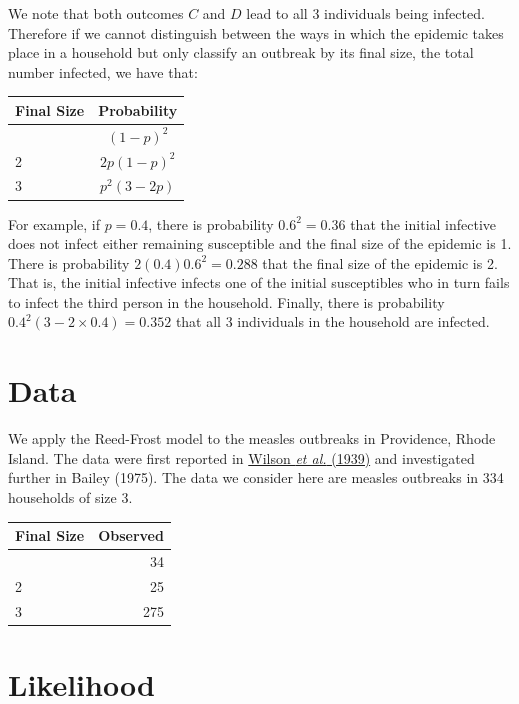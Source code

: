 \documentclass[
]{book}
\begin{document}
We note that both outcomes \(C\) and \(D\) lead to all 3 individuals being infected. Therefore if we cannot distinguish between the ways in which the epidemic takes place in a household but only classify an outbreak by its final size, the total number infected, we have that:

\begin{longtable}[]{@{}lc@{}}
\toprule\noalign{}
Final Size & Probability \\
\midrule\noalign{}
\endhead
\bottomrule\noalign{}
\endlastfoot
1 & \((1-p)^2\) \\
2 & \(2p(1-p)^2\) \\
3 & \(p^2(3-2p)\) \\
\end{longtable}

For example, if \(p=0.4\), there is probability \(0.6^2 = 0.36\) that the initial infective does not infect either remaining susceptible and the final size of the epidemic is 1. There is probability \(2 (0.4) 0.6^2 = 0.288\) that the final size of the epidemic is 2. That is, the initial infective infects one of the initial susceptibles who in turn fails to infect the third person in the household. Finally, there is probability \(0.4^2 (3-2\times 0.4) = 0.352\) that all 3 individuals in the household are infected.

\hypertarget{sec_data}{%
\section{Data}\label{sec_data}}

We apply the Reed-Frost model to the measles outbreaks in Providence, Rhode Island. The data were first reported in \href{https://www.jstor.org/stable/984949\#metadata_info_tab_contents}{Wilson \emph{et al.} (1939)} and investigated further in Bailey (1975). The data we consider here are measles outbreaks in 334 households of size 3.

\begin{longtable}[]{@{}lr@{}}
\toprule\noalign{}
Final Size & Observed \\
\midrule\noalign{}
\endhead
\bottomrule\noalign{}
\endlastfoot
1 & 34 \\
2 & 25 \\
3 & 275 \\
\end{longtable}

\hypertarget{sec_like}{%
\section{Likelihood}\label{sec_like}}
\end{document}

